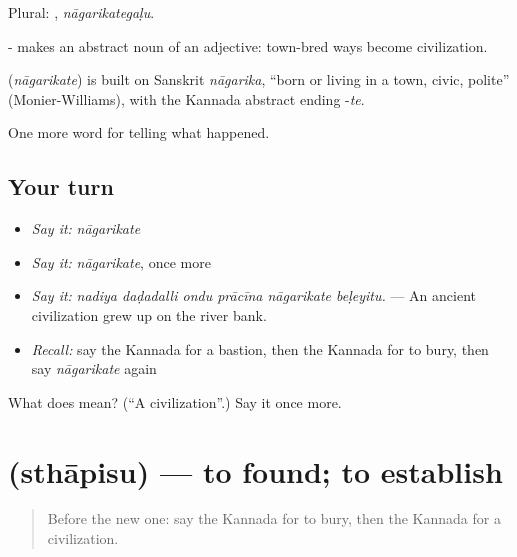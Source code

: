 Plural: , \emph{nāgarikategaḷu}.

- makes an abstract noun of an adjective: town-bred ways become civilization.

\begin{cousinweb}
\textbf{} (\emph{nāgarikate}) is built on Sanskrit \emph{nāgarika}, \textquotedblleft{}born or living in a town, civic, polite\textquotedblright{} (Monier-Williams), with the Kannada abstract ending -\emph{te}.
\end{cousinweb}

\begin{grammarlens}[title={What you've built}]
One more word for telling what happened.
\end{grammarlens}

\subsection*{Your turn}
\begin{itemize}
\raggedright
  \item \emph{Say it:} \emph{nāgarikate}
  \item \emph{Say it:} \emph{nāgarikate}, once more
  \item \emph{Say it:} \emph{nadiya daḍadalli ondu prācīna nāgarikate beḷeyitu.} — An ancient civilization grew up on the river bank.
  \item \emph{Recall:} say the Kannada for a bastion, then the Kannada for to bury, then say \emph{nāgarikate} again
\end{itemize}

\begin{tcolorbox}[breakable,colback=teal!4,colframe=teal!35!black,title={Before you move on}]
What does  mean? (\textquotedblleft{}A civilization\textquotedblright{}.) Say it once more.
\end{tcolorbox}
\section[\texorpdfstring{\kn{ಸ್ಥಾಪಿಸು} (sthāpisu)}{ಸ್ಥಾಪಿಸು (sthāpisu)}]{ (sthāpisu) — to found; to establish}

\label{lesson:KA-C362-sthapisu}



\begin{quote}
Before the new one: say the Kannada for to bury, then the Kannada for a civilization.
\end{quote}

